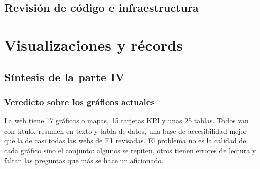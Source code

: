 \documentclass[11pt,openany]{report}
\newcommand{\parte}[2]{\part{#1}\label{#2}}
\begin{document}
\chapter{Revisión de código e infraestructura}\label{cap:codigo}


\parte{Visualizaciones y récords}{parte:graficos}

\chapter*{Síntesis de la parte IV}

\section*{Veredicto sobre los gráficos actuales}

La web tiene 17 gráficos o mapas, 15 tarjetas KPI y unas 25 tablas. Todos van con título, resumen en
texto y tabla de datos, una base de accesibilidad mejor que la de casi todas las webs de F1
revisadas. El problema no es la calidad de cada gráfico sino el conjunto: algunos se repiten, otros
tienen errores de lectura y faltan las preguntas que más se hace un aficionado.
\end{document}
